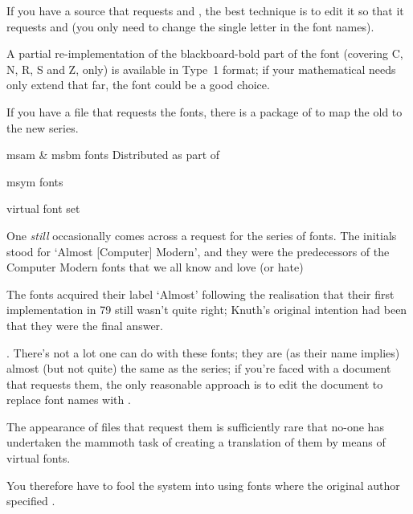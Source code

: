 If you have a  source that requests  and
, the best technique is to edit it so that it requests
 and  (you only need to change the single
letter in the font names).

A partial re-implementation of the blackboard-bold part of the
 font (covering C, N, R, S and Z, only) is available in
Type~1 format; if your mathematical needs only extend that far, the
font could be a good choice.

If you have a  file that requests the fonts, there is a package
of  to map the old to the new series.
\begin{ctanrefs}
\item[msam \& msbm \nothtml{\rmfamily}fonts]Distributed as part of 
\item[msym \nothtml{\rmfamily}fonts]
\item[\nothtml{\rmfamily}virtual font set]
\end{ctanrefs}



One \emph{still} occasionally comes across a request for the 
series of fonts.  The initials stood for `Almost [Computer] Modern',
and they were the predecessors of the Computer Modern fonts that we
all know and love (or hate)%
\begin{footnoteenv}
  The fonts acquired their label `Almost' following the realisation
  that their first implementation in \MF{}79 still wasn't quite right;
  Knuth's original intention had been that they were the final answer.
\end{footnoteenv}.
There's not a lot one can do with these
fonts; they are (as their name implies) almost (but not quite) the
same as the  series; if you're faced with a document that requests
them, the only reasonable approach is to edit the document to replace
 font names with .

The appearance of  files that request them is sufficiently
rare that no-one has undertaken the mammoth task of creating a
translation of them by means of virtual fonts.

You therefore have to fool the system into using  fonts
where the original author specified .

